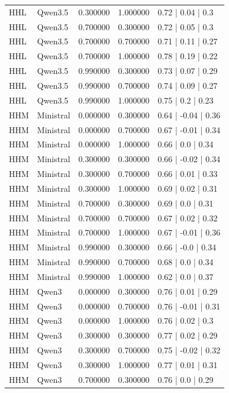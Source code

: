 \begin{longtable}{lllll}
HHL & Qwen3.5 & 0.300000 & 1.000000 & 0.72 | 0.04 | 0.3 \\
HHL & Qwen3.5 & 0.700000 & 0.300000 & 0.72 | 0.05 | 0.3 \\
HHL & Qwen3.5 & 0.700000 & 0.700000 & 0.71 | 0.11 | 0.27 \\
HHL & Qwen3.5 & 0.700000 & 1.000000 & 0.78 | 0.19 | 0.22 \\
HHL & Qwen3.5 & 0.990000 & 0.300000 & 0.73 | 0.07 | 0.29 \\
HHL & Qwen3.5 & 0.990000 & 0.700000 & 0.74 | 0.09 | 0.27 \\
HHL & Qwen3.5 & 0.990000 & 1.000000 & 0.75 | 0.2 | 0.23 \\
HHM & Ministral & 0.000000 & 0.300000 & 0.64 | -0.04 | 0.36 \\
HHM & Ministral & 0.000000 & 0.700000 & 0.67 | -0.01 | 0.34 \\
HHM & Ministral & 0.000000 & 1.000000 & 0.66 | 0.0 | 0.34 \\
HHM & Ministral & 0.300000 & 0.300000 & 0.66 | -0.02 | 0.34 \\
HHM & Ministral & 0.300000 & 0.700000 & 0.66 | 0.01 | 0.33 \\
HHM & Ministral & 0.300000 & 1.000000 & 0.69 | 0.02 | 0.31 \\
HHM & Ministral & 0.700000 & 0.300000 & 0.69 | 0.0 | 0.31 \\
HHM & Ministral & 0.700000 & 0.700000 & 0.67 | 0.02 | 0.32 \\
HHM & Ministral & 0.700000 & 1.000000 & 0.67 | -0.01 | 0.36 \\
HHM & Ministral & 0.990000 & 0.300000 & 0.66 | -0.0 | 0.34 \\
HHM & Ministral & 0.990000 & 0.700000 & 0.68 | 0.0 | 0.34 \\
HHM & Ministral & 0.990000 & 1.000000 & 0.62 | 0.0 | 0.37 \\
HHM & Qwen3 & 0.000000 & 0.300000 & 0.76 | 0.01 | 0.29 \\
HHM & Qwen3 & 0.000000 & 0.700000 & 0.76 | -0.01 | 0.31 \\
HHM & Qwen3 & 0.000000 & 1.000000 & 0.76 | 0.02 | 0.3 \\
HHM & Qwen3 & 0.300000 & 0.300000 & 0.77 | 0.02 | 0.29 \\
HHM & Qwen3 & 0.300000 & 0.700000 & 0.75 | -0.02 | 0.32 \\
HHM & Qwen3 & 0.300000 & 1.000000 & 0.77 | 0.01 | 0.31 \\
HHM & Qwen3 & 0.700000 & 0.300000 & 0.76 | 0.0 | 0.29 \\

\end{longtable}
